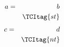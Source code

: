 \documentclass{article}
\begin{document}
\begin{eqnarray*}
a&=&b \\
&& \TCItag{st}
\end{eqnarray*}
\begin{eqnarray}
c&=&d \nonumber\\
&& \nonumber\TCItag{nt}
\end{eqnarray}
\end{document}
